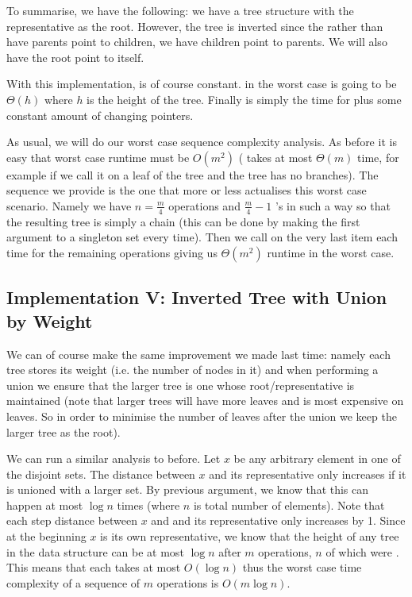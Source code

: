 To summarise, we have the following: we have a tree structure with the representative as the root. However, the tree is inverted since the rather than have parents point to children, we have children point to parents. We will also have the root point to itself.


With this implementation,  is of course constant.  in the worst case is going to be $\Theta(h)$ where $h$ is the height of the tree. Finally  is simply the time for  plus some constant amount of changing pointers. 

As usual, we will do our worst case sequence complexity analysis. As before it is easy that worst case runtime must be $O(m^2)$ ( takes at most $\Theta(m)$ time, for example if we call it on a leaf of the tree and the tree has no branches). The sequence we provide is the one that more or less actualises this worst case scenario. Namely we have $n = \frac{m}{4}$  operations and $\frac{m}{4} - 1$ 's in such a way so that the resulting tree is simply a chain (this can be done by making the first argument to  a singleton set every time). Then we call  on the very last item each time for the remaining operations giving us $\Theta(m^2)$ runtime in the worst case.

\subsection{Implementation V: Inverted Tree with Union by Weight}
We can of course make the same improvement we made last time: namely each tree stores its weight (i.e. the number of nodes in it) and when performing a union we ensure that the larger tree is one whose root/representative is maintained (note that larger trees will have more leaves and  is most expensive on leaves. So in order to minimise the number of leaves after the union we keep the larger tree as the root). 

We can run a similar analysis to before. Let $x$ be any arbitrary element in one of the disjoint sets. The distance between $x$ and its representative only increases if it is unioned with a larger set. By previous argument, we know that this can happen at most $\log n$ times (where $n$ is total number of elements). Note that each step distance between $x$ and and its representative only increases by 1. Since at the beginning $x$ is its own representative, we know that the height of any tree in the data structure can be at most $\log n$ after $m$ operations, $n$ of which were . This means that each  takes at most $O(\log n)$ thus the worst case time complexity of a sequence of $m$ operations is $O(m \log n)$. 


